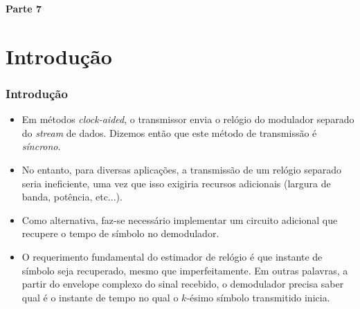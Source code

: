 
\begin{frame}
	\begin{block}{\centering\large\bfseries Parte 7}
		\centering\large\insertpart
	\end{block}
\end{frame}

\section{Introdução}
\begin{frame}[t]
	\frametitle{Introdução}
	
	\begin{itemize}
        \item Em métodos \textit{clock-aided}, o transmissor envia o relógio do modulador separado do \textit{stream} de dados. Dizemos então que este método de transmissão é \emph{síncrono}.
        \item No entanto, para diversas aplicações, a transmissão de um relógio separado seria ineficiente, uma vez que isso exigiria recursos adicionais (largura de banda, potência, etc...).
        \item Como alternativa, faz-se necessário implementar um circuito adicional que recupere o tempo de símbolo no demodulador.
        \item O requerimento fundamental do estimador de relógio é que instante de símbolo seja recuperado, mesmo que imperfeitamente. Em outras palavras, a partir do envelope complexo do sinal recebido, o demodulador precisa saber qual é o instante de tempo no qual o \(k\)-ésimo símbolo transmitido inicia.
    \end{itemize}
\end{frame}

